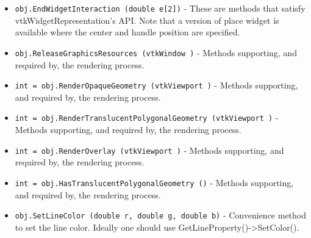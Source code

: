 \begin{itemize}
\item  \verb|obj.EndWidgetInteraction (double e[2])| -  These are methods that satisfy vtkWidgetRepresentation's API. Note that a 
 version of place widget is available where the center and handle position
 are specified.

\item  \verb|obj.ReleaseGraphicsResources (vtkWindow )| -  Methods supporting, and required by, the rendering process.

\item  \verb|int = obj.RenderOpaqueGeometry (vtkViewport )| -  Methods supporting, and required by, the rendering process.

\item  \verb|int = obj.RenderTranslucentPolygonalGeometry (vtkViewport )| -  Methods supporting, and required by, the rendering process.

\item  \verb|int = obj.RenderOverlay (vtkViewport )| -  Methods supporting, and required by, the rendering process.

\item  \verb|int = obj.HasTranslucentPolygonalGeometry ()| -  Methods supporting, and required by, the rendering process.

\item  \verb|obj.SetLineColor (double r, double g, double b)| -  Convenience method to set the line color.
 Ideally one should use GetLineProperty()->SetColor().

\end{itemize}
